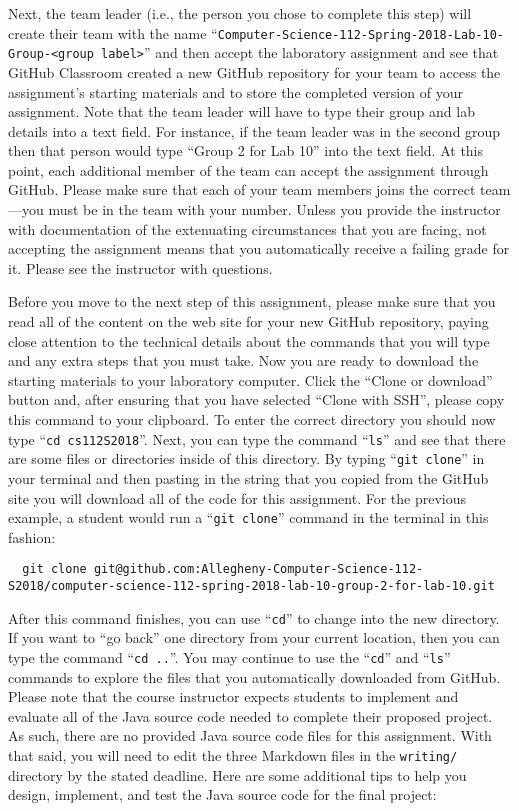 \documentclass[11pt]{article}
\newcommand{\command}[1]{``\lstinline{#1}''}
\newcommand{\program}[1]{\lstinline{#1}}
\newcommand{\step}[1]{``{#1}''}
\begin{document}
Next, the team leader (i.e., the person you chose to complete this step) will
create their team with the name
\command{Computer-Science-112-Spring-2018-Lab-10-Group-<group label>} and then
accept the laboratory assignment and see that GitHub Classroom created a new
GitHub repository for your team to access the assignment's starting materials
and to store the completed version of your assignment. Note that the team leader
will have to type their group and lab details into a text field. For instance,
if the team leader was in the second group then that person would type ``Group 2
for Lab 10'' into the text field. At this point, each additional member of the
team can accept the assignment through GitHub. Please make sure that each of
your team members joins the correct team---you must be in the team with your
number. Unless you provide the instructor with documentation of the extenuating
circumstances that you are facing, not accepting the assignment means that you
automatically receive a failing grade for it. Please see the instructor with
questions.

Before you move to the next step of this assignment, please make sure that you
read all of the content on the web site for your new GitHub repository, paying
close attention to the technical details about the commands that you will type
and any extra steps that you must take. Now you are ready to download the
starting materials to your laboratory computer. Click the ``Clone or download''
button and, after ensuring that you have selected ``Clone with SSH'', please
copy this command to your clipboard. To enter the correct directory you should
now type \command{cd cs112S2018}. Next, you can type the command \command{ls}
and see that there are some files or directories inside of this directory. By
typing \command{git clone} in your terminal and then pasting in the string that
you copied from the GitHub site you will download all of the code for this
assignment. For the previous example, a student would run a \command{git clone}
command in the terminal in this fashion:

\begin{lstlisting}
  git clone git@github.com:Allegheny-Computer-Science-112-S2018/computer-science-112-spring-2018-lab-10-group-2-for-lab-10.git
\end{lstlisting}

After this command finishes, you can use \command{cd} to change into the new directory. If you want to \step{go back}
one directory from your current location, then you can type the command \command{cd ..}. You may continue to use the
\command{cd} and \command{ls} commands to explore the files that you automatically downloaded from GitHub. Please note
that the course instructor expects students to implement and evaluate all of the Java source code needed to complete
their proposed project. As such, there are no provided Java source code files for this assignment. With that said, you
will need to edit the three Markdown files in the \program{writing/} directory by the stated deadline. Here are some
additional tips to help you design, implement, and test the Java source code for the final project:
\end{document}
